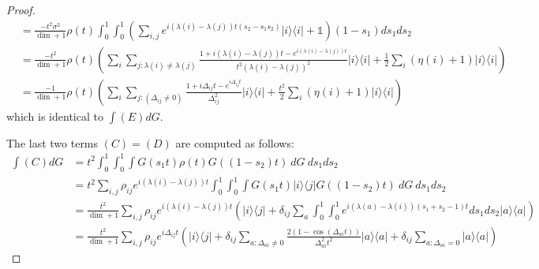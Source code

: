 \documentclass[
 amsmath,amssymb,
 aps,
onecolumn, 
nofootinbib]{revtex4-2}
\newcommand{\ketbra}[2]{| #1\rangle\! \langle #2|}
\newcommand{\parens}[1]{\left( #1 \right)}
\newcommand{\identity}{\mathds{1}}
\begin{document}
\begin{proof}
\begin{align}
    &= \frac{- t^2 \sigma ^2}{\dim + 1} \rho(t) \int_0^1 \int_0^1 \parens{\sum_{i,j} e^{i(\lambda(i) - \lambda(j))t (s_2 - s_1 s_2)}\ketbra{i}{i} + \identity} (1-s_1) ds_1 ds_2 \\
    &= \frac{- t^2 }{\dim + 1} \rho(t) \parens{\sum_{i} \sum_{j : \lambda(i) \neq \lambda(j)} \frac{1 + i (\lambda(i) - \lambda(j))t - e^{i (\lambda(i) - \lambda(j))t}}{t^2 (\lambda(i) - \lambda(j))^2} \ketbra{i}{i} +\frac{1}{2} \sum_{i} (\eta(i) + 1) \ketbra{i}{i}} \\
    &= \frac{- 1}{\dim + 1} \rho(t) \parens{\sum_i \sum_{j: (\Delta_{ij} \neq 0)} \frac{1 + i \Delta_{ij}t - e^{i\Delta_{ij}t}}{\Delta_{ij}^2} \ketbra{i}{i} + \frac{t^2}{2}\sum_i (\eta(i) + 1) \ketbra{i}{i}}
\end{align}
 which is identical to $\int (E) dG$.

 The last two terms $(C) = (D)$ are computed as follows:
 \begin{align}
     \int (C) dG &= t^2 \int_0^1 \int_0^1 \int G(s_1 t) \rho(t) G((1-s_2)t) ~dG ~ ds_1 ds_2 \\
     &= t^2 \sum_{i,j} \rho_{ij} e^{i(\lambda(i) - \lambda(j))t} \int_0^1 \int_0^1 \int G(s_1 t) \ketbra{i}{j} G((1-s_2)t) ~ dG ~ ds_1 ds_2 \\
     &= \frac{ t^2}{\dim + 1} \sum_{i,j} \rho_{ij} e^{i(\lambda(i) - \lambda(j))t} \parens{ \ketbra{i}{j} + \delta_{ij} \sum_{a} \int_0^1 \int_0^1 e^{i(\lambda(a) - \lambda(i))(s_1 + s_2 - 1)t} ds_1 ds_2 \ketbra{a}{a}} \\
     &= \frac{ t^2}{\dim + 1} \sum_{i,j} \rho_{ij} e^{i \Delta_{ij} t} \parens{\ketbra{i}{j} + \delta_{ij} \sum_{a : \Delta_{ai} \neq 0} \frac{2( 1- \cos (\Delta_{ai} t))}{\Delta_{ai}^2 t^2} \ketbra{a}{a} + \delta_{ij} \sum_{a : \Delta_{ai} = 0} \ketbra{a}{a}}
 \end{align}


\end{proof}
\end{document}
